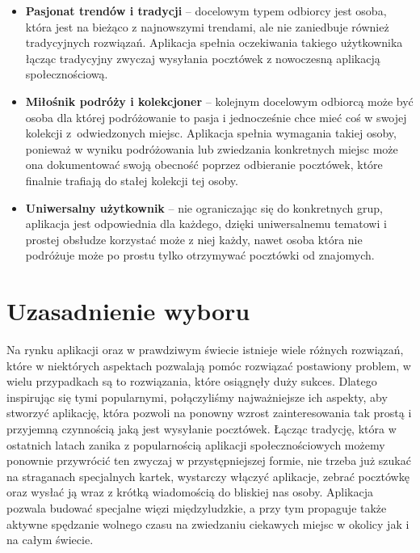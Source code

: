 \documentclass[a4paper,twoside,12pt]{book}
\begin{document}
\begin{itemize}
    \item \textbf{Pasjonat trendów i tradycji} -- docelowym typem odbiorcy jest osoba, która jest na bieżąco z najnowszymi trendami, ale nie zaniedbuje również tradycyjnych rozwiązań. Aplikacja spełnia oczekiwania takiego użytkownika łącząc tradycyjny zwyczaj wysyłania pocztówek z nowoczesną aplikacją społecznościową. 
    \item \textbf{Miłośnik podróży i kolekcjoner} -- kolejnym docelowym odbiorcą może być osoba dla której podróżowanie to pasja i jednocześnie chce mieć coś w swojej kolekcji z~odwiedzonych miejsc. Aplikacja spełnia wymagania takiej osoby, ponieważ w wyniku podróżowania lub zwiedzania konkretnych miejsc może ona dokumentować swoją obecność poprzez odbieranie pocztówek, które finalnie trafiają do stałej kolekcji tej osoby.
    \item \textbf{Uniwersalny użytkownik} -- nie ograniczając się do konkretnych grup, aplikacja jest odpowiednia dla każdego, dzięki uniwersalnemu tematowi i prostej obsłudze korzystać może z niej każdy, nawet osoba która nie podróżuje może po prostu tylko otrzymywać pocztówki od znajomych.
\end{itemize}

\section{Uzasadnienie wyboru}
Na rynku aplikacji oraz w prawdziwym świecie istnieje wiele różnych rozwiązań, które w niektórych aspektach pozwalają pomóc rozwiązać postawiony problem, w wielu przypadkach są to rozwiązania, które osiągnęły duży sukces. Dlatego inspirując się tymi popularnymi, połączyliśmy najważniejsze ich aspekty, aby stworzyć aplikację, która pozwoli na ponowny wzrost zainteresowania tak prostą i przyjemną czynnością jaką jest wysyłanie pocztówek. Łącząc tradycję, która w ostatnich latach zanika z popularnością aplikacji społecznościowych możemy ponownie przywrócić ten zwyczaj w przystępniejszej formie, nie trzeba już szukać na straganach specjalnych kartek, wystarczy włączyć aplikacje, zebrać pocztówkę oraz wysłać ją wraz z krótką wiadomością do bliskiej nas osoby. Aplikacja pozwala budować specjalne więzi międzyludzkie, a przy tym propaguje także aktywne spędzanie wolnego czasu na zwiedzaniu ciekawych miejsc w okolicy jak i na całym świecie.

\newpage

\end{document}
